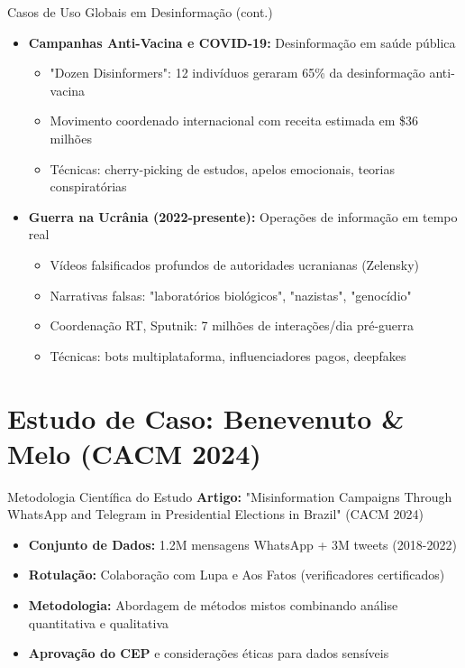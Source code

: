 \documentclass[aspectratio=169,xcolor=table]{beamer}
\begin{document}
\begin{frame}{Casos de Uso Globais em Desinformação (cont.)}
    \begin{itemize}
        \item \textbf{Campanhas Anti-Vacina e COVID-19:} Desinformação em saúde pública
        \begin{itemize}
            \item "Dozen Disinformers": 12 indivíduos geraram 65\% da desinformação anti-vacina
            \item Movimento coordenado internacional com receita estimada em \$36 milhões
            \item Técnicas: cherry-picking de estudos, apelos emocionais, teorias conspiratórias
        \end{itemize}
        \item \textbf{Guerra na Ucrânia (2022-presente):} Operações de informação em tempo real
        \begin{itemize}
            \item Vídeos falsificados profundos de autoridades ucranianas (Zelensky)
            \item Narrativas falsas: "laboratórios biológicos", "nazistas", "genocídio"
            \item Coordenação RT, Sputnik: 7 milhões de interações/dia pré-guerra
            \item Técnicas: bots multiplataforma, influenciadores pagos, deepfakes
        \end{itemize}
    \end{itemize}
\end{frame}

\section{Estudo de Caso: Benevenuto \& Melo (CACM 2024)}
\begin{frame}{Metodologia Científica do Estudo}
    \textbf{Artigo:} "Misinformation Campaigns Through WhatsApp and Telegram in Presidential Elections in Brazil" (CACM 2024)
    \begin{itemize}
        \item \textbf{Conjunto de Dados:} 1.2M mensagens WhatsApp + 3M tweets (2018-2022)
        \item \textbf{Rotulação:} Colaboração com Lupa e Aos Fatos (verificadores certificados)
        \item \textbf{Metodologia:} Abordagem de métodos mistos combinando análise quantitativa e qualitativa
        \item \textbf{Aprovação do CEP} e considerações éticas para dados sensíveis
    \end{itemize}
\end{frame}
\end{document}
